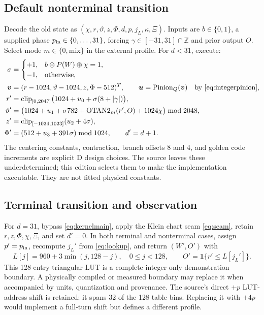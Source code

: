 \documentclass[11pt,a4paper]{article}
\newcommand{\Z}{\mathbb{Z}}
\newcommand{\B}{\{0,1\}}
\newcommand{\ind}{\mathbf{1}}
\newcommand{\clip}{\operatorname{clip}}
\newcommand{\OT}{\operatorname{OTAN2}}
\numberwithin{equation}{section}
\begin{document}
\subsection{Default nonterminal transition}
Decode the old state as $(\chi,r,\vartheta,z,\Phi,d,p,j_L,\kappa,\Xi)$. Inputs are $b\in\B$, a supplied phase $p_{\rm in}\in\{0,\ldots,31\}$, forcing $\gamma\in[-31,31]\cap\Z$ and prior output $O$. Select mode $m\in\{0,\mathrm{mix}\}$ in the external profile. For $d<31$, execute:
\begin{align}
\sigma&=\begin{cases}+1,&b\oplus P(W)\oplus\chi=1,\\-1,&\text{otherwise},\end{cases}\\
\bm v&=(r-1024,\vartheta-1024,z,\Phi-512)^T,\qquad
\bm u=\operatorname{Pinion}_{Q}(\bm v)\quad\text{by \eqref{eq:integerpinion}},\\
r'&=\clip_{[0,2047]}\bigl(1024+u_0+\sigma(8+|\gamma|)\bigr),\\
\vartheta'&=\bigl(1024+u_1+\sigma782+\OT_m(r',O)+1024\chi\bigr)\bmod2048,\\
z'&=\clip_{[-1024,1023]}(u_2+4\sigma),\\
\Phi'&=(512+u_3+391\sigma)\bmod1024,\qquad d'=d+1.
\label{eq:kernelmain}
\end{align}
The centering constants, contraction, branch offsets 8 and 4, and golden code increments are explicit \textsf{D} design choices. The source leaves these underdetermined; this edition selects them to make the implementation executable. They are not fitted physical constants.

\subsection{Terminal transition and observation}
For $d=31$, bypass \eqref{eq:kernelmain}, apply the Klein chart seam \eqref{eq:seam}, retain $r,z,\Phi,\chi,\Xi$, and set $d'=0$. In both terminal and nonterminal cases, assign $p'=p_{\rm in}$, recompute $j_L'$ from \eqref{eq:lookup}, and return $(W',O')$ with
\begin{equation}
L[j]=960+3\min(j,128-j),\quad 0\le j<128,\qquad
O'=\ind\{r'\le L[j_L']\}.
\label{eq:demolut}
\end{equation}
This 128-entry triangular LUT is a complete integer-only demonstration boundary. A physically compiled or measured boundary may replace it when accompanied by units, quantization and provenance. The source's direct $+p$ LUT-address shift is retained: it spans 32 of the 128 table bins. Replacing it with $+4p$ would implement a full-turn shift but defines a different profile.
\end{document}
